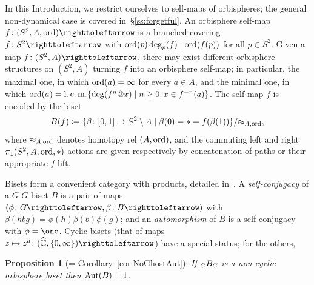 \documentclass{amsart}
\newtheorem{mainprop}[mainthm]{Proposition}
\begin{document}
In this Introduction, we restrict ourselves to self-maps of
orbispheres; the general non-dynamical case is covered
in~\S\ref{ss:forgetful}. An orbisphere self-map
$f\colon(S^2,A,\ord)\selfmap$ is a branched covering
$f\colon S^2\selfmap$ with $\operatorname{ord}(p)\deg_p(f)\mid\operatorname{ord}(f(p))$ for all
$p\in S^2$. Given a map $f\colon(S^2,A)\selfmap$, there may exist
different orbisphere structures on $(S^2,A)$ turning $f$ into an
orbisphere self-map; in particular, the maximal one, in which
$\operatorname{ord}(a)=\infty$ for every $a\in A$, and the minimal one, in which
$\operatorname{ord}(a)=\operatorname{l.c.m.}\{\deg(f^n@x)\mid n\ge0, x\in f^{-n}(a)\}$. The self-map
$f$ is encoded by the biset
\begin{equation}\label{def:B(f)}
  B(f)\coloneqq\{\beta\colon[0,1]\to S^2\setminus A\mid
  \beta(0)=*=f(\beta(1))\}/{\approx_{A,\operatorname{ord}}},
\end{equation}
where $\approx_{A,\operatorname{ord}}$ denotes homotopy rel $(A,\operatorname{ord})$, and the
commuting left and right $\pi_1(S^2,A,\operatorname{ord},*)$-actions are given
respectively by concatenation of paths or their appropriate $f$-lift.

Bisets form a convenient category with products, detailed
in~\cite{bartholdi-dudko:bc1}. A \emph{self-conjugacy} of a
$G$-$G$-biset $B$ is a pair of maps
$(\phi\colon G\selfmap,\beta\colon B\selfmap)$ with
$\beta(h b g)=\phi(h)\beta(b)\phi(g)$; and an \emph{automorphism} of
$B$ is a self-conjugacy with $\phi=\one$. Cyclic bisets (that of maps
$z\mapsto z^d\colon (\widehat{\C},\{0,\infty\})\selfmap$) have a special status; for the others,
\begin{mainprop}[= Corollary~\ref{cor:NoGhostAut}]\label{mainprop:NoGhostAut}
  If $\subscript G B_G$ is a non-cyclic orbisphere biset then
  $\operatorname{Aut}(B)=1$.
\end{mainprop}
\end{document}
